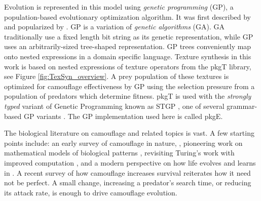 \documentclass[acmtog,
    anonymous,
    review
    ]{acmart}
\newcommand{\jargon}[1]{\textit{#1}}
\newcommand{\texsyn}[0]{pkgT}
\newcommand{\lazypredator}[0]{pkgE}
\begin{document}
\par
Evolution is represented in this model using \jargon{genetic programming} (GP), a population-based evolutionary optimization algorithm. It was first described by \citet{cramer_representation_1985} and popularized by \citet{koza_genetic_1992}. GP is a variation of \jargon{genetic algorithms} (GA). GA traditionally use a fixed length bit string as its genetic representation, while GP uses an arbitrarily-sized tree-shaped representation. GP trees conveniently map onto nested expressions in a domain specific language. Texture synthesis in this work is based on nested expressions of texture operators from the \texsyn{} library, see Figure \ref{fig:TexSyn_overview}. A prey population of these textures is optimized for camouflage effectiveness by GP using the selection pressure from a population of predators which determine fitness. \texsyn{} is used with the \jargon{strongly typed} variant of Genetic Programming known as STGP \cite{montana_strongly_1995}, one of several grammar-based GP variants \cite{Mckay_2010}. The GP implementation used here is called \lazypredator{}.
\par
The biological literature on camouflage and related topics is vast. A few starting points include: an early survey of camouflage in nature, \citet{thayer_concealing-coloration_1909}, pioneering work on mathematical models of biological patterns \citet{turing_chemical_1952}, revisiting Turing's work with improved computation \citet{murray_how_1988}, and a modern perspective on how life evolves and learns in \citet{valiant_probably_2013}. A recent survey of how camouflage increases survival \cite{de_alcantara_viana_predator_2022} reiterates how it need not be perfect. A small change, increasing a predator's search time, or reducing its attack rate, is enough to drive camouflage evolution.
\par

\end{document}
